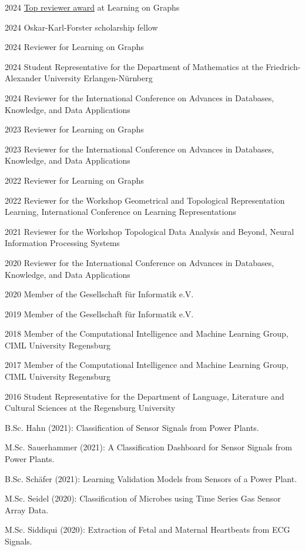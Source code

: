 \documentclass[a4paper, 11pt]{article}
\newcommand{\years}[1]{\marginnote{\scriptsize #1}}
\begin{document}
\years{Service}
\vspace{-10pt}
\begin{etaremune}[itemsep=-5pt, leftmargin=15pt]
	\item[2024] \href{https://x.com/LogConference/status/1862602407395697123}{Top reviewer award} at Learning on Graphs
	\item[2024] Oskar-Karl-Forster scholarship fellow
	\item[2024] Reviewer for Learning on Graphs
	\item[2024] Student Representative for the Department of Mathematics at the Friedrich-Alexander University Erlangen-Nürnberg
	\item[2024] Reviewer for the International Conference on Advances in Databases, Knowledge, and Data Applications
	\item[2023] Reviewer for Learning on Graphs
	\item[2023] Reviewer for the International Conference on Advances in Databases, Knowledge, and Data Applications
	\item[2022] Reviewer for Learning on Graphs
	\item[2022] Reviewer for the Workshop Geometrical and Topological Representation Learning, International Conference on Learning Representations
	\item[2021] Reviewer for the Workshop Topological Data Analysis and Beyond, Neural Information Processing Systems
	\item[2020] Reviewer for the International Conference on Advances in Databases, Knowledge, and Data Applications
	\item[2020] Member of the Gesellschaft für Informatik e.V.
	\item[2019] Member of the Gesellschaft für Informatik e.V.
	\item[2018] Member of the Computational Intelligence and Machine Learning Group, CIML University Regensburg
	\item[2017] Member of the Computational Intelligence and Machine Learning Group, CIML University Regensburg
	\item[2016] Student Representative for the Department of Language, Literature and Cultural Sciences at the Regensburg University
\end{etaremune}
\vspace{10pt}

\years{Supervision}
\vspace{-10pt}
\begin{etaremune}[itemsep=-5pt, leftmargin=15pt]
	\item B.Sc. Hahn (2021): Classification of Sensor Signals from Power Plants.
	\item M.Sc. Sauerhammer (2021): A Classification Dashboard for Sensor Signals from Power Plants.
	\item B.Sc. Schäfer (2021): Learning Validation Models from Sensors of a Power Plant.
	\item M.Sc. Seidel (2020): Classification of Microbes using Time Series Gas Sensor Array Data.
	\item M.Sc. Siddiqui (2020): Extraction of Fetal and Maternal Heartbeats from ECG Signals.
\end{etaremune}
\end{document}
